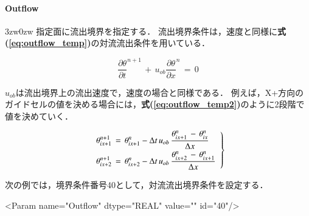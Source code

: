 %
\paragraph{Outflow}
\begin{indentation}{3zw}{0zw}
指定面に流出境界を指定する．
流出境界条件は，速度と同様に\textbf{式(\ref{eq:outflow_temp})}の対流流出条件を用いている．

\begin{equation}
{\frac{\partial \theta}{\partial t}}^{n+1}\, + \, u_{ob} {\frac{\partial \theta}{\partial x}}^n \,=\,0
\label{eq:outflow_temp}
\end{equation}

\noindent $u_{ob}$は流出境界上の流出速度で，速度の場合と同様である．
例えば，X+方向のガイドセルの値を決める場合には，\textbf{式(\ref{eq:outflow_temp2})}のように2段階で値を決めていく．

\begin{equation}
\left.
\begin{array}{l}
\vspace{1mm}
\displaystyle{ \theta_{ix+1}^{n+1} \,=\, \theta_{ix+1}^n - \Delta t \,u_{ob}\, \frac{\theta_{ix+1}^n\, - \,\theta_{ix}^n}{\Delta x} }\\
\displaystyle{ \theta_{ix+2}^{n+1} \,=\, \theta_{ix+2}^n - \Delta t \,u_{ob}\, \frac{\theta_{ix+2}^n\, - \,\theta_{ix+1}^n}{\Delta x} }\\
\end{array} \right \}
\label{eq:outflow_temp2}
\end{equation}

次の例では，境界条件番号40として，対流流出境界条件を設定する．
{ \small
\begin{program}
<Param name="Outflow" dtype="REAL" value="" id="40"/>
\end{program}
}
\end{indentation}


